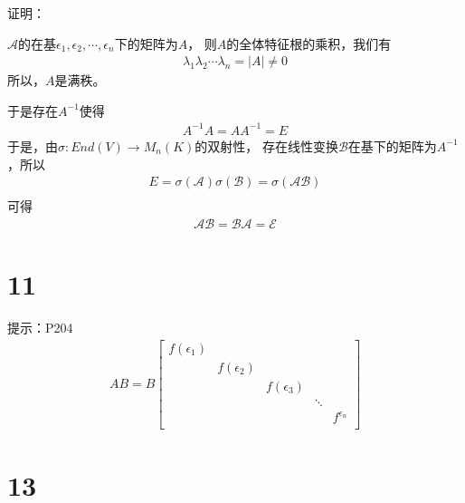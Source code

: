 \documentclass{article}
\begin{document}
证明：

$\mathscr{A}$的在基$\epsilon_1, \epsilon_2, \cdots, \epsilon_n$下的矩阵为$A$，
则$A$的全体特征根的乘积，我们有
\begin{align*}
  \lambda_1 \lambda_2 \cdots \lambda_n = |A| \neq 0
\end{align*}
所以，$A$是满秩。

于是存在$A^{-1}$使得
\begin{align*}
  A^{-1} A = A A^{-1} = E
\end{align*}
于是，由$\sigma: End(V) \to M_n(K)$的双射性，
存在线性变换$\mathscr{B}$在基下的矩阵为$A^{-1}$，所以
\begin{align*}
  E = \sigma(\mathscr{A}) \sigma(\mathscr{B}) = \sigma(\mathscr{A}\mathscr{B}) \\
\end{align*}
可得
\begin{align*}
  \mathscr{A} \mathscr{B} = \mathscr{B} \mathscr{A} = \mathscr{E}
\end{align*}

\section*{11}

提示：P204
\begin{align*}
  A B = B \begin{bmatrix}
            f(\epsilon_1) &               &               &        &                \\
                          & f(\epsilon_2) &               &        &                \\
                          &               & f(\epsilon_3) &        &                \\
                          &               &               & \ddots &                \\
                          &               &               &        & f^{\epsilon_n} \\
          \end{bmatrix}
\end{align*}

\section*{13}
\end{document}
